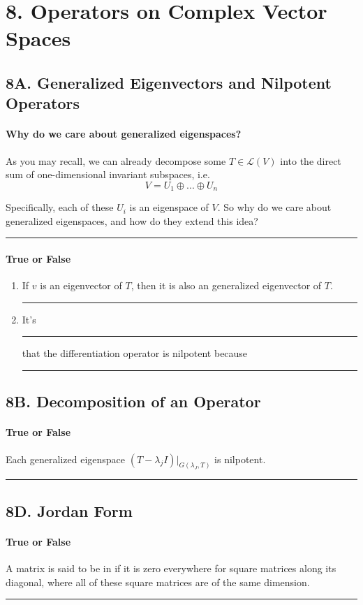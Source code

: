 \documentclass{article}
\newcommand{\blank}[1]{\rule[0ex]{#1in}{0.5pt}}
\begin{document}
\section*{8. Operators on Complex Vector Spaces}
\subsection*{8A. Generalized Eigenvectors and Nilpotent Operators}
\paragraph{Why do we care about generalized eigenspaces?}
As you may recall, we can already decompose some $T \in \mathcal{L}(V)$ into the direct sum of one-dimensional invariant subspaces, i.e.
\[ V = U_1 \oplus ... \oplus U_n \]

Specifically, each of these $U_i$ is an eigenspace of $V$. So why do we care about generalized eigenspaces, and how do they extend this idea? 

\blank{5}

\paragraph{True or False}
\begin{enumerate}
    \item If $v$ is an eigenvector of $T$, then it is also an generalized eigenvector of $T$. \blank{1}

    \item It's \blank{0.5} that the differentiation operator is nilpotent because \blank{1}
\end{enumerate}

\subsection*{8B. Decomposition of an Operator}
\paragraph{True or False} Each generalized eigenspace $(T - \lambda_j I)|_{G(\lambda_J, T)}$ is nilpotent. \blank{1}

\subsection*{8D. Jordan Form}
\paragraph{True or False} A matrix is said to be in  if it is zero everywhere for square matrices along its diagonal, where all of these square matrices are of the same dimension. \blank{1.5}
\end{document}
